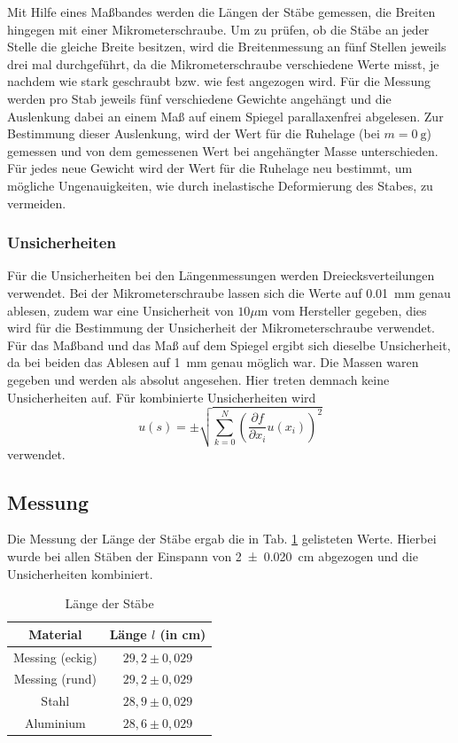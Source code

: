 	Mit Hilfe eines Maßbandes werden die Längen der Stäbe gemessen, die Breiten hingegen mit einer Mikrometerschraube. Um zu prüfen, ob die Stäbe an jeder Stelle die gleiche Breite besitzen, wird die Breitenmessung an fünf Stellen jeweils drei mal durchgeführt, da die Mikrometerschraube verschiedene Werte misst, je nachdem wie stark geschraubt bzw. wie fest angezogen wird. 
	Für die Messung werden pro Stab jeweils fünf verschiedene Gewichte angehängt und die Auslenkung dabei an einem Maß auf einem Spiegel parallaxenfrei abgelesen. Zur Bestimmung dieser Auslenkung, wird der Wert für die Ruhelage (bei $m=\SI{0}{\g}$) gemessen und von dem gemessenen Wert bei angehängter Masse unterschieden. Für jedes neue Gewicht wird der Wert für die Ruhelage neu bestimmt, um mögliche Ungenauigkeiten, wie durch inelastische Deformierung des Stabes, zu vermeiden.
	
	\subsubsection*{Unsicherheiten}
	
	Für die Unsicherheiten bei den Längenmessungen werden Dreiecksverteilungen verwendet. Bei der Mikrometerschraube lassen sich die Werte auf \SI{0,01}{\mm} genau ablesen, zudem war eine Unsicherheit von $10\mu $m vom Hersteller gegeben, dies wird für die Bestimmung der Unsicherheit der Mikrometerschraube verwendet. Für das Maßband und das Maß auf dem Spiegel ergibt sich dieselbe Unsicherheit, da bei beiden das Ablesen auf \SI{1}{\mm} genau möglich war.
	Die Massen waren gegeben und werden als absolut angesehen. Hier treten demnach keine Unsicherheiten auf.
	Für kombinierte Unsicherheiten wird
	\begin{equation}
	u(s) = \pm \sqrt{\sum_{k=0}^{N}\left( \frac{\partial f}{\partial x_i}u(x_i)\right) ^2} \label{eq:kombUnsicherheit}
	\end{equation}
	verwendet.
	
	\subsection{Messung}
	
	Die Messung der Länge der Stäbe ergab die in Tab. \ref{tab:Stablängen} gelisteten Werte. Hierbei wurde bei allen Stäben der Einspann von \SI{2+-0,020}{\cm} abgezogen und die Unsicherheiten kombiniert.
	\begin{table}[h]
		\caption{Länge der Stäbe}
		\centering
		\label{tab:Stablängen}
		\begin{tabular}{c|c}
			{Material} & {Länge $l$ (in cm)}\\
			\hline
			{Messing (eckig)} & {$29,2\pm 0,029$}\\
			{Messing (rund)} &  {$29,2\pm 0,029$}\\
			{Stahl} & {$28,9\pm 0,029$}\\
			{Aluminium} & {$28,6\pm 0,029$}\\		
		\end{tabular}
	\end{table}
	
